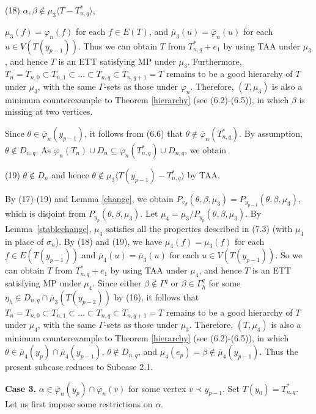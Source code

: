 \documentclass[11pt]{article}
\newcommand{\phibar}{\overline{\varphi}}
\begin{document}
(18) $\alpha, \beta \notin \mu_3 \langle T-T_{n,q}^* \rangle$,

\noindent $\mu_3(f)=\varphi_n(f)$ for each $f\in E(T)$, and $\overline{\mu}_3(u)= \phibar_n(u)$ for each $u\in V(T(y_{p-1}))$. 
Thus we can obtain $T$ from $T_{n,q}^*+e_1$ by using TAA under $\mu_3$, and hence $T$ is an ETT satisfying MP under $\mu_3$. 
Furthermore, $T_n=T_{n,0} \subset T_{n,1} \subset \ldots \subset T_{n,q} \subset T_{n,q+1}=T$ remains to be a good hierarchy 
of $T$ under $\mu_3$, with the same $\Gamma$-sets as those under $\varphi_n$. Therefore, $(T, \mu_3)$ is also a minimum 
counterexample to Theorem \ref{hierarchy} (see (6.2)-(6.5)), in which $\beta$ is missing at two vertices.

Since $\theta \in \overline{\varphi}_n(y_{p-1})$, it follows from (6.6) that $\theta\notin \overline{\varphi}_n(T_{n,q}^*)$.
By assumption, $\theta\notin D_{n,q}$. As $\overline{\varphi}_n(T_n) \cup D_n \subseteq  \overline{\varphi}_n(T_{n,q}^*) \cup D_{n,q}$, we obtain

(19) $\theta\notin D_n$ and hence $\theta \notin \mu_3 \langle T(y_{p-1})-T_{n,q}^* \rangle$ by TAA.

By (17)-(19) and Lemma \ref{change}, we obtain $P_{v_{\beta}}(\theta,\beta,\mu_3)=P_{y_{p-1}}(\theta,\beta,\mu_3)$,
which is disjoint from $P_{y_{p}}(\theta,\beta,\mu_3)$. Let $\mu_4=\mu_3/P_{y_{p}}(\theta,\beta,\mu_3)$.
By Lemma~\ref{stablechange},  $\mu_4$ satisfies all the properties described in (7.3) (with $\mu_4$ in place of
$\sigma_n$).  By (18) and (19), we have $\mu_4(f)=\mu_3(f)$ for each $f\in E(T(y_{p-1}))$ and $\overline{\mu}_4(u)= \overline{\mu}_3(u)$ for each $u\in V(T(y_{p-1}))$. So we can obtain $T$ from $T_{n,q}^*+e_1$ by using TAA under $\mu_4$, and hence 
$T$ is an ETT satisfying MP under $\mu_4$. Since either $\beta \notin \Gamma^{q}$ or $\beta \in \Gamma^{q}_h$ for some $\eta_h 
\in D_{n,q}\cap \overline{\mu}_3(T(y_{p-2}))$ by (16), it follows that $T_n=T_{n,0} \subset T_{n,1} \subset \ldots \subset 
T_{n,q} \subset T_{n,q+1}=T$ remains to be a good hierarchy of $T$ under $\mu_4$, with the same $\Gamma$-sets as those under 
$\mu_3$. Therefore, $(T, \mu_4)$ is also a minimum counterexample to Theorem \ref{hierarchy} (see (6.2)-(6.5)), in which 
$\theta \in\overline{\mu}_4(y_p)\cap\overline{\mu}_4(y_{p-1})$, $\theta \notin D_{n,q}$, and $\mu_4(e_p)=\beta \notin \overline{\mu}_4(y_{p-1})$. Thus the present subcase reduces to Subcase 2.1.

\vskip 2mm

{\bf Case 3.} $\alpha\in \overline{\varphi}_n(y_p)\cap\overline{\varphi}_n(v)$ for some vertex $v\prec y_{p-1}$.
\vskip 1mm
Set $T(y_0)=T_{n,q}^*$. Let us first impose some restrictions on $\alpha$.
\end{document}
